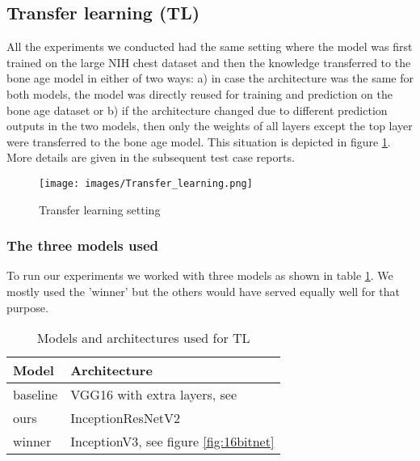 \documentclass[10pt,twocolumn,letterpaper]{article}
\begin{document}
\subsection{Transfer learning (TL)}
All the experiments we conducted had the same setting where the model was first trained on the large NIH chest dataset and then the knowledge transferred to the bone age model in either of two ways: a) in case the architecture was the same for both models, the model was directly reused for training and prediction on the bone age dataset or b) if the architecture changed due to different prediction outputs in the two models, then only the weights of all layers except the top layer were transferred to the bone age model. This situation is depicted in figure \ref{fig:transferls}. More details are given in the subsequent test case reports.

\begin{figure}[H]
\texttt{[image: images/Transfer\_learning.png]}
\centering
\caption{Transfer learning setting}
\label{fig:transferls}
\end{figure}

\subsubsection{The three models used}
To run our experiments we worked with three models as shown in table \ref{table:models}. We mostly used the 'winner' but the others would have served equally well for that purpose.

\begin{table}[h]
\begin{center}
\begin{tabular}{|l|l|}
\hline
Model & Architecture \\
\hline\hline
baseline & VGG16 with extra layers, see \cite{kaggleboneage} \\
ours & InceptionResNetV2  \\
winner & InceptionV3, see figure \ref{fig:16bitnet} \\
\hline
\end{tabular}
\end{center}
\caption{Models and architectures used for TL}
\label{table:models}
\end{table}
\end{document}
